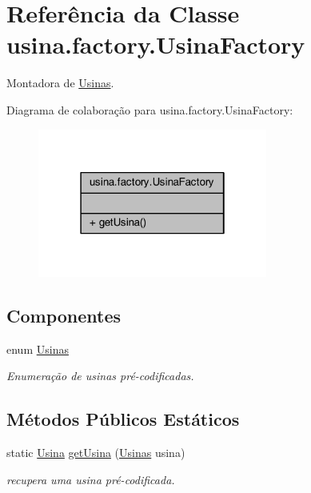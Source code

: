 \hypertarget{classusina_1_1factory_1_1_usina_factory}{\section{Referência da Classe usina.\-factory.\-Usina\-Factory}
\label{classusina_1_1factory_1_1_usina_factory}
}


Montadora de \hyperlink{enumusina_1_1factory_1_1_usina_factory_1_1_usinas}{Usinas}.  




Diagrama de colaboração para usina.\-factory.\-Usina\-Factory\-:\nopagebreak
\begin{figure}[H]
\begin{center}
\leavevmode
\includegraphics[width=214pt]{classusina_1_1factory_1_1_usina_factory__coll__graph}
\end{center}
\end{figure}
\subsection*{Componentes}
\begin{DoxyCompactItemize}
\item 
enum \hyperlink{enumusina_1_1factory_1_1_usina_factory_1_1_usinas}{Usinas}
\begin{DoxyCompactList}\small\item\em Enumeração de usinas pré-\/codificadas. \end{DoxyCompactList}\end{DoxyCompactItemize}
\subsection*{Métodos Públicos Estáticos}
\begin{DoxyCompactItemize}
\item 
static \hyperlink{classusina_1_1_usina}{Usina} \hyperlink{classusina_1_1factory_1_1_usina_factory_aa4f9161439504d21a0522739319e7707}{get\-Usina} (\hyperlink{enumusina_1_1factory_1_1_usina_factory_1_1_usinas}{Usinas} usina)
\begin{DoxyCompactList}\small\item\em recupera uma usina pré-\/codificada. \end{DoxyCompactList}\end{DoxyCompactItemize}


